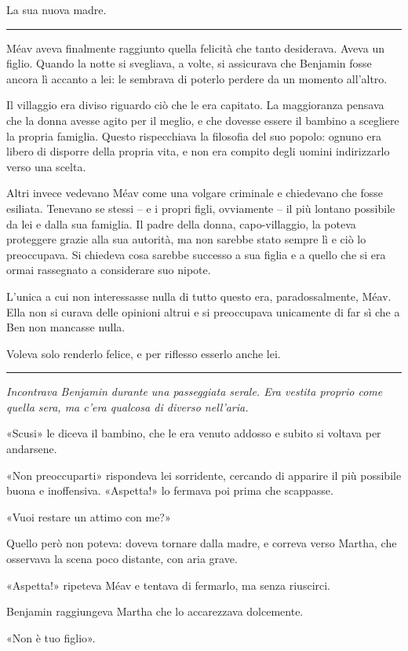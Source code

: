 \documentclass[a4paper,11pt,oneside,openright,final]{memoir}
\begin{document}
La sua nuova madre.

\plainbreak{1}

Méav aveva finalmente raggiunto quella felicità che tanto desiderava. Aveva un
figlio. Quando la notte si svegliava, a volte, si assicurava che Benjamin fosse
ancora lì accanto a lei: le sembrava di poterlo perdere da un momento
all'altro.

Il villaggio era diviso riguardo ciò che le era capitato. La maggioranza
pensava che la donna avesse agito per il meglio, e che dovesse essere il bambino
a scegliere la propria famiglia. Questo rispecchiava la filosofia del suo
popolo: ognuno era libero di disporre della propria vita, e non era compito
degli uomini indirizzarlo verso una scelta.

Altri invece vedevano Méav come una volgare criminale e chiedevano che fosse
esiliata. Tenevano se stessi -- e i propri figli, ovviamente -- il più
lontano possibile da lei e dalla sua famiglia. Il padre della donna,
capo-villaggio, la poteva proteggere grazie alla sua autorità, ma non sarebbe
stato sempre lì e ciò lo preoccupava. Si chiedeva cosa sarebbe successo a sua
figlia e a quello che si era ormai rassegnato a considerare suo nipote.

L'unica a cui non interessasse nulla di tutto questo era, paradossalmente,
Méav. Ella non si curava delle opinioni altrui e si preoccupava unicamente di
far sì che a Ben non mancasse nulla.

Voleva solo renderlo felice, e per riflesso esserlo anche lei.

\plainbreak{1}

{\itshape
Incontrava Benjamin durante una passeggiata serale. Era vestita proprio come
quella sera, ma c'era qualcosa di diverso nell'aria.

«Scusi» le diceva il bambino, che le era venuto addosso e subito si voltava
per andarsene.

«Non preoccuparti» rispondeva lei sorridente, cercando di apparire il più
possibile buona e inoffensiva. «Aspetta!» lo fermava poi prima che scappasse.

«Vuoi restare un attimo con me?»

Quello però non poteva: doveva tornare dalla madre, e correva verso Martha, che
osservava la scena poco distante, con aria grave.

«Aspetta!» ripeteva Méav e tentava di fermarlo, ma senza riuscirci.

Benjamin raggiungeva Martha che lo accarezzava dolcemente.

«Non è tuo figlio».
\/}
\end{document}
